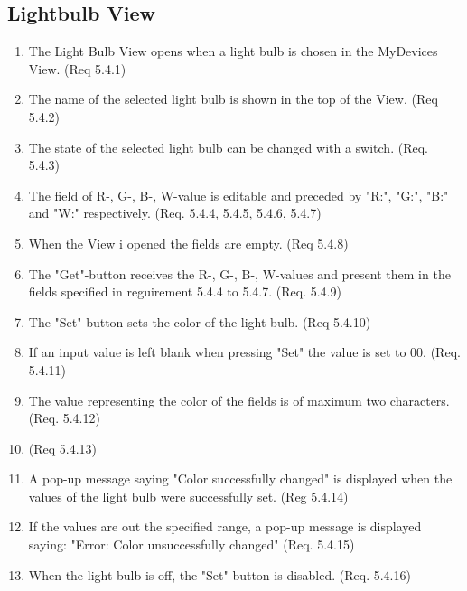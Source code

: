 \documentclass[a4paper]{article}
\newlength{\testlabellength}
\newenvironment{testlist}{\begin{enumerate}[label=\bfseries Test \thesubsection.\arabic* , labelindent=0pt, labelwidth=\testlabellength , leftmargin=2cm]}{\end{enumerate}}
\begin{document}
\begin{appendices}
%
%


\subsection{Lightbulb View}
\begin{testlist}
	\item The Light Bulb View opens when a light bulb is chosen in the MyDevices View. (Req 5.4.1)
    \item The name of the selected light bulb is shown in the top of the View. (Req 5.4.2)    
    \item The state of the selected light bulb can be changed with a switch. (Req. 5.4.3)
    \item The field of R-, G-, B-, W-value is editable and preceded by "R:", "G:", "B:" and "W:" respectively. (Req. 5.4.4, 5.4.5, 5.4.6, 5.4.7) 
     \item When the View i opened the fields are empty. (Req 5.4.8)
    \item The "Get"-button receives the R-, G-, B-, W-values and present them in the fields specified in reguirement 5.4.4 to 5.4.7. (Req. 5.4.9)
	\item The "Set"-button sets the color of the light bulb. (Req 5.4.10)
    \item If an input value is left blank when pressing "Set" the value is set to 00. (Req. 5.4.11)
    \item The value representing the color of the fields is of maximum two characters. (Req. 5.4.12)
    \item (Req 5.4.13)
    \item A pop-up message saying "Color successfully changed" is displayed when the values of the light bulb were successfully set. (Reg 5.4.14)
    \item If the values are out the specified range, a pop-up message is displayed saying: "Error: Color unsuccessfully changed" (Req. 5.4.15)
    \item When the light bulb is off, the "Set"-button is disabled. (Req. 5.4.16)


\end{testlist}
\end{appendices}
\end{document}
